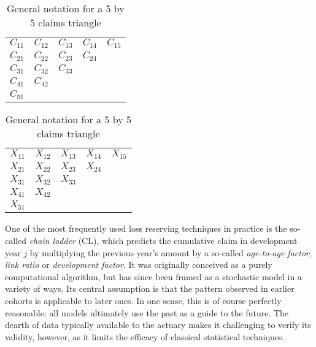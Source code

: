\documentclass[a4paper]{book}
\begin{document}
\begin{table}
  \centering
  \begin{subtable}{0.45\textwidth}
    \centering
    \large
    \begin{tabular}{c c c c c}
      $C_{11}$ & $C_{12}$ & $C_{13}$ & $C_{14}$ & $C_{15}$ \\
      $C_{21}$ & $C_{22}$ & $C_{23}$ & $C_{24}$ &          \\
      $C_{31}$ & $C_{32}$ & $C_{33}$ &          &          \\
      $C_{41}$ & $C_{42}$ &          &          &          \\
      $C_{51}$ &          &          &          &
    \end{tabular}
  \end{subtable}
  \begin{subtable}{0.45\textwidth}
    \centering
    \large
    \begin{tabular}{c c c c c}
      $X_{11}$ & $X_{12}$ & $X_{13}$ & $X_{14}$ & $X_{15}$ \\
      $X_{21}$ & $X_{22}$ & $X_{23}$ & $X_{24}$ &          \\
      $X_{31}$ & $X_{32}$ & $X_{33}$ &          &          \\
      $X_{41}$ & $X_{42}$ &          &          &          \\
      $X_{51}$ &          &          &          &
    \end{tabular}
  \end{subtable}
  \caption{General notation for a 5 by 5 claims triangle}
\end{table}

One of the most frequently used loss reserving techniques in practice is the so-called \emph{chain ladder} (CL), which predicts the cumulative claim in development year $j$ by multiplying the previous year's amount by a so-called \emph{age-to-age factor}, \emph{link ratio} or \emph{development factor}. It was originally conceived as a purely computational algorithm, but has since been framed as a stochastic model in a variety of ways. Its central assumption is that the pattern observed in earlier cohorts is applicable to later ones. In one sense, this is of course perfectly reasonable: all models ultimately use the past as a guide to the future. The dearth of data typically available to the actuary makes it challenging to verify its validity, however, as it limits the efficacy of classical statistical techniques.
\end{document}
